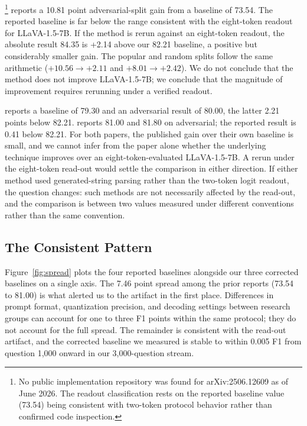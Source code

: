 \documentclass[11pt,letterpaper]{article}
\begin{document}
\citet{visflow2025}\footnote{No public implementation repository was
found for arXiv:2506.12609 as of June 2026. The readout classification
rests on the reported baseline value (73.54) being consistent with
two-token protocol behavior rather than confirmed code inspection.}
reports a 10.81 point adversarial-split gain from
a baseline of 73.54. The reported baseline is far below the range
consistent with the eight-token readout for LLaVA-1.5-7B. If the
method is rerun against an eight-token readout, the absolute result
84.35 is +2.14 above our 82.21 baseline, a positive but considerably
smaller gain. The popular and random splits follow the same arithmetic
($+10.56 \to +2.11$ and $+8.01 \to +2.42$). We do not conclude that
the method does not improve LLaVA-1.5-7B; we conclude that the
magnitude of improvement requires rerunning under a verified readout.

\citet{seo2025} reports a baseline of 79.30 and an adversarial result
of 80.00, the latter 2.21 points below 82.21.
\citet{adaptvis2025} reports 81.00 and 81.80 on adversarial; the
reported result is 0.41 below 82.21. For both papers, the published
gain over their own baseline is small, and we cannot infer from the
paper alone whether the underlying technique improves over an
eight-token-evaluated LLaVA-1.5-7B. A rerun under the eight-token
read-out would settle the comparison in either direction. If either
method used generated-string parsing rather than the two-token
logit readout, the question changes: such methods are not necessarily
affected by the read-out, and the comparison is between two values
measured under different conventions rather than the same convention.

\subsection{The Consistent Pattern}

Figure~\ref{fig:spread} plots the four reported baselines alongside our
three corrected baselines on a single axis. The 7.46 point spread among
the prior reports (73.54 to 81.00) is what alerted us to the artifact in
the first place. Differences in prompt format, quantization precision,
and decoding settings between research groups can account for one to
three F1 points within the same protocol; they do not account for the
full spread. The remainder is consistent with the read-out artifact, and
the corrected baseline we measured is stable to within 0.005 F1 from
question 1{,}000 onward in our 3{,}000-question stream.
\end{document}
